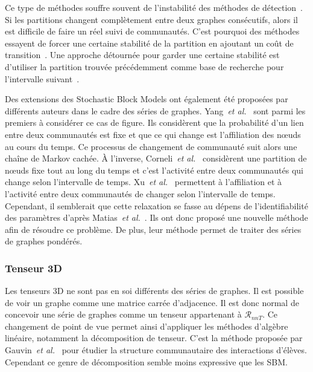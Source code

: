 Ce type de méthodes souffre souvent de l'instabilité des méthodes de détection~\cite{Aynaud2010,Harenberg2014a}.
Si les partitions changent complètement entre deux graphes consécutifs, alors il est difficile de faire un réel suivi de communautés.
C'est pourquoi des méthodes essayent de forcer une certaine stabilité de la partition en ajoutant un coût de transition~\cite{Chakrabarti2006,Chen2013,Kalavathi2015}.
Une approche détournée pour garder une certaine stabilité est d'utiliser la partition trouvée précédemment comme base de recherche pour l'intervalle suivant~\cite{Lancichinetti2011a}.

Des extensions des Stochastic Block Models ont également été proposées par différents auteurs dans le cadre des séries de graphes.
Yang~\emph{et al.}~\cite{Yang2011} sont parmi les premiers à considérer ce cas de figure.
Ils considèrent que la probabilité d'un lien entre deux communautés est fixe et que ce qui change est l'affiliation des n\oe{}uds au cours du temps.
Ce processus de changement de communauté suit alors une chaîne de Markov cachée.
\`A l'inverse, Corneli~\emph{et al.}~\cite{Corneli2016} considèrent une partition de n\oe{}uds fixe tout au long du temps et c'est l'activité entre deux communautés qui change selon l'intervalle de temps.
Xu~\emph{et al.}~\cite{Xu2014} permettent à l'affiliation et à l'activité entre deux communautés de changer selon l'intervalle de temps.
Cependant, il semblerait que cette relaxation se fasse au dépens de l'identifiabilité des paramètres d'après Matias~\emph{et al.}~\cite{Matias2015}.
Ils ont donc proposé une nouvelle méthode afin de résoudre ce problème.
De plus, leur méthode permet de traiter des séries de graphes pondérés.

\subsubsection{Tenseur 3D}
Les tenseurs 3D ne sont pas en soi différents des séries de graphes.
Il est possible de voir un graphe comme une matrice carrée d'adjacence.
Il est donc normal de concevoir une série de graphes comme un tenseur appartenant à $\mathcal{R}_{nnT}$.
Ce changement de point de vue permet ainsi d'appliquer les méthodes d'algèbre linéaire, notamment la décomposition de tenseur.
C'est la méthode proposée par Gauvin~\emph{et al.}~\cite{Gauvin2014} pour étudier la structure communautaire des interactions d'élèves.
Cependant ce genre de décomposition semble moins expressive que les SBM.


